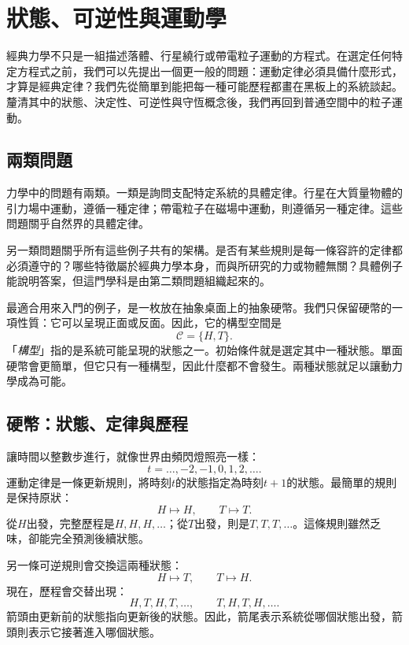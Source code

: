 \chapter{狀態、可逆性與運動學}

經典力學不只是一組描述落體、行星繞行或帶電粒子運動的方程式。在選定任何特定方程式之前，我們可以先提出一個更一般的問題：運動定律必須具備什麼形式，才算是經典定律？我們先從簡單到能把每一種可能歷程都畫在黑板上的系統談起。釐清其中的狀態、決定性、可逆性與守恆概念後，我們再回到普通空間中的粒子運動。

\section{兩類問題}

力學中的問題有兩類。一類是詢問支配特定系統的具體定律。行星在大質量物體的引力場中運動，遵循一種定律；帶電粒子在磁場中運動，則遵循另一種定律。這些問題關乎自然界的具體定律。

另一類問題關乎所有這些例子共有的架構。是否有某些規則是每一條容許的定律都必須遵守的？哪些特徵屬於經典力學本身，而與所研究的力或物體無關？具體例子能說明答案，但這門學科是由第二類問題組織起來的。

最適合用來入門的例子，是一枚放在抽象桌面上的抽象硬幣。我們只保留硬幣的一項性質：它可以呈現正面或反面。因此，它的構型空間是
\begin{equation}
  \mathcal C=\{H,T\}.
\end{equation}
「\emph{構型}」指的是系統可能呈現的狀態之一。初始條件就是選定其中一種狀態。單面硬幣會更簡單，但它只有一種構型，因此什麼都不會發生。兩種狀態就足以讓動力學成為可能。

\section{硬幣：狀態、定律與歷程}

讓時間以整數步進行，就像世界由頻閃燈照亮一樣：
\begin{equation}
  t=\ldots,-2,-1,0,1,2,\ldots .
\end{equation}
運動定律是一條更新規則，將時刻\(t\)的狀態指定為時刻\(t+1\)的狀態。最簡單的規則是保持原狀：
\begin{equation}
  H\longmapsto H,
  \qquad
  T\longmapsto T.
  \label{eq:coin-identity}
\end{equation}
從\(H\)出發，完整歷程是\(H,H,H,\ldots\)；從\(T\)出發，則是\(T,T,T,\ldots\)。這條規則雖然乏味，卻能完全預測後續狀態。

另一條可逆規則會交換這兩種狀態：
\begin{equation}
  H\longmapsto T,
  \qquad
  T\longmapsto H.
  \label{eq:coin-flip}
\end{equation}
現在，歷程會交替出現：
\begin{equation}
  H,T,H,T,\ldots,
  \qquad
  T,H,T,H,\ldots .
\end{equation}
箭頭由更新前的狀態指向更新後的狀態。因此，箭尾表示系統從哪個狀態出發，箭頭則表示它接著進入哪個狀態。

